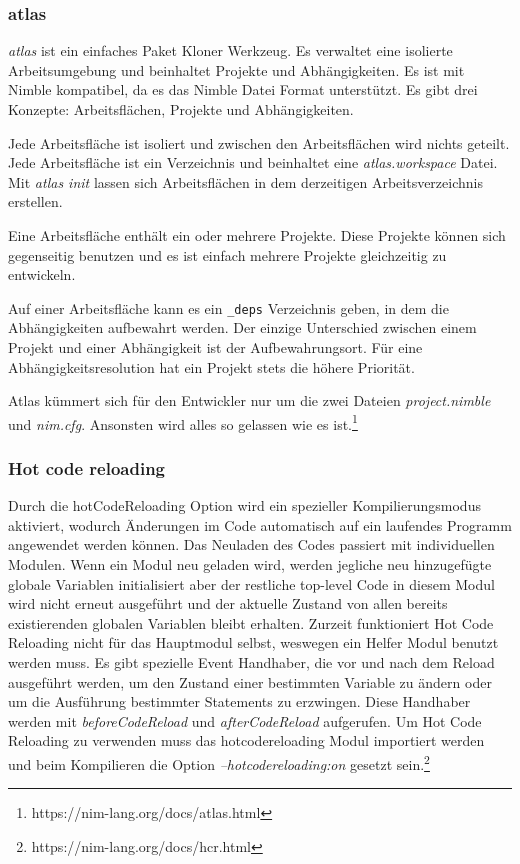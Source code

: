 \documentclass[11pt]{report}
\begin{document}
\subsubsection{atlas}
\emph{atlas} ist ein einfaches Paket Kloner Werkzeug. Es verwaltet eine isolierte Arbeitsumgebung und beinhaltet Projekte und Abhängigkeiten. Es ist mit Nimble kompatibel, da es das Nimble Datei Format unterstützt.
Es gibt drei Konzepte: Arbeitsflächen, Projekte und Abhängigkeiten.

Jede Arbeitsfläche ist isoliert und zwischen den Arbeitsflächen wird nichts geteilt. Jede Arbeitsfläche ist ein Verzeichnis und beinhaltet eine \emph{atlas.workspace} Datei. Mit \emph{atlas init} lassen sich Arbeitsflächen in dem derzeitigen Arbeitsverzeichnis erstellen.

Eine Arbeitsfläche enthält ein oder mehrere Projekte. Diese Projekte können sich gegenseitig benutzen und es ist einfach mehrere Projekte gleichzeitig zu entwickeln.

Auf einer Arbeitsfläche kann es ein \verb|_deps| Verzeichnis geben, in dem die Abhängigkeiten aufbewahrt werden. Der einzige Unterschied zwischen einem Projekt und einer Abhängigkeit ist der Aufbewahrungsort. Für eine Abhängigkeitsresolution hat ein Projekt stets die höhere Priorität.

Atlas kümmert sich für den Entwickler nur um die zwei Dateien \emph{project.nimble} und \emph{nim.cfg}. Ansonsten wird alles so gelassen wie es ist.\footnote{https://nim-lang.org/docs/atlas.html}

\subsubsection{Hot code reloading}
Durch die hotCodeReloading Option wird ein spezieller Kompilierungsmodus aktiviert, wodurch Änderungen im Code automatisch auf ein laufendes Programm angewendet werden können. Das Neuladen des Codes passiert mit individuellen Modulen. Wenn ein Modul neu geladen wird, werden jegliche neu hinzugefügte globale Variablen initialisiert aber der restliche top-level Code in diesem Modul wird nicht erneut ausgeführt und der aktuelle Zustand von allen bereits existierenden globalen Variablen bleibt erhalten. Zurzeit funktioniert Hot Code Reloading nicht für das Hauptmodul selbst, weswegen ein Helfer Modul benutzt werden muss. Es gibt spezielle Event Handhaber, die vor und nach dem Reload ausgeführt werden, um den Zustand einer bestimmten Variable zu ändern oder um die Ausführung bestimmter Statements zu erzwingen. Diese Handhaber werden mit \emph{beforeCodeReload} und \emph{afterCodeReload} aufgerufen. Um Hot Code Reloading zu verwenden muss das hotcodereloading Modul importiert werden und beim Kompilieren die Option \emph{--hotcodereloading:on} gesetzt sein.\footnote{https://nim-lang.org/docs/hcr.html}
\end{document}
